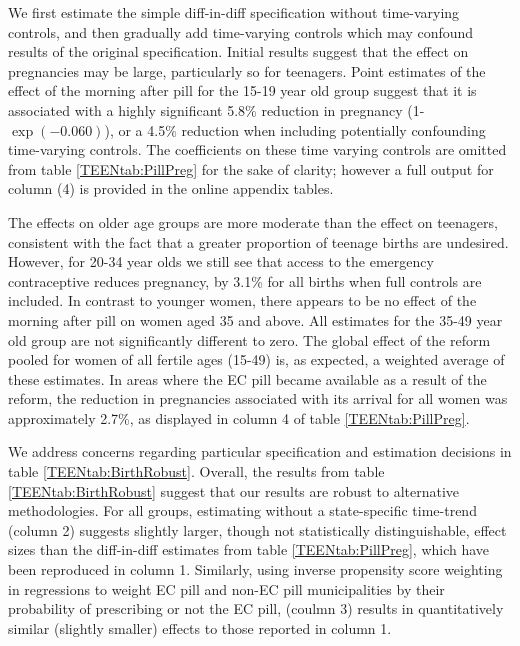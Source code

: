 We first estimate the simple diff-in-diff specification without time-varying 
controls, and then gradually add time-varying controls which may confound results 
of the original specification.  Initial results suggest that the effect on 
pregnancies may be large, particularly so for teenagers.  Point estimates of the
effect of the morning after pill for the 15-19 year old group suggest that it is 
associated with a highly significant 5.8\% reduction in pregnancy 
(1-$\exp(-0.060)$), or a 4.5\% reduction when including potentially confounding 
time-varying controls.  The coefficients on these time varying controls are 
omitted from table \ref{TEENtab:PillPreg} for the sake of clarity; however a 
full output for column (4) is provided in the online appendix tables.

The effects on older age groups are more moderate than the effect on teenagers,
consistent with the fact that a greater proportion of teenage births are
undesired.  However, for 20-34 year olds we still see that access to the 
emergency contraceptive reduces pregnancy, by 3.1\% for all births when full 
controls are included.  In contrast to younger women, there appears to be no 
effect of the morning after pill on women aged 35 and above.  All estimates for 
the 35-49 year old group are not significantly different to zero.  The global 
effect of the reform pooled for women of all fertile ages (15-49) is, as 
expected, a weighted average of these estimates.  In areas where the EC pill
became available as a result of the reform, the reduction in pregnancies 
associated with its arrival for all women was approximately 2.7\%, as displayed
in column 4 of table \ref{TEENtab:PillPreg}.

We address concerns regarding particular specification and estimation decisions
in table \ref{TEENtab:BirthRobust}.  Overall, the results from table 
\ref{TEENtab:BirthRobust} suggest that our results are robust to alternative
methodologies.  For all groups, estimating without a state-specific time-trend
(column 2) suggests slightly larger, though not statistically distinguishable, 
effect sizes than the diff-in-diff estimates from table \ref{TEENtab:PillPreg},
which have been reproduced in column 1.  Similarly, using inverse propensity
score weighting in regressions to weight EC pill and non-EC pill municipalities
by their probability of prescribing or not the EC pill, (coulmn 3) results in 
quantitatively similar (slightly smaller) effects to those reported in column 1.

